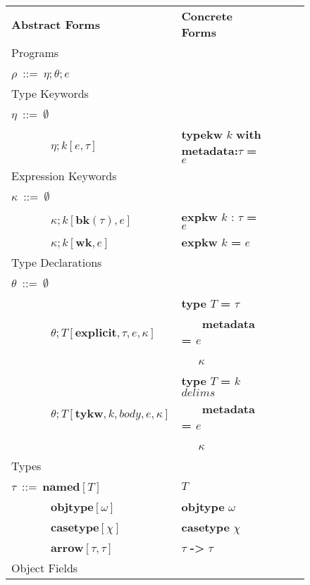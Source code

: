 \documentclass{sig-alternate}
\makeatletter
\newcommand\BeraMonottfamily{%
  \def\fvm@Scale{0.85}%
  \fontfamily{fvm}\selectfont%
}
\newcommand{\textcd}[1]{\textbf{\scriptsize\BeraMonottfamily{#1}}}
\newcommand{\tabularspace}{~~~~~~~}
\makeatother
\begin{document}
\begin{figure}[ht]
\begin{tabular}{ l l l l l }
 \multicolumn{1}{l}{\textbf{Abstract Forms}} & \multicolumn{1}{l}{\textbf{Concrete Forms}}\\
 \multicolumn{3}{l}{Programs}\\
$\rho$~::=~$\eta;\theta;e$\\
\multicolumn{3}{l}{Type Keywords}\\
$\eta$~::=~$\emptyset$\\
\tabularspace$\eta;k[e,\tau]$ & \textcd{typekw} $k$ \textcd{with metadata:}$\tau$ \textcd{=} $e$ \\
\multicolumn{3}{l}{Expression Keywords}\\
$\kappa$~::=~$\emptyset$                        & \\
\tabularspace$\kappa;k[\mathbf{bk}(\tau),e]$    & \textcd{expkw} $k$ : $\tau$ \textcd{=} $e$\\
\tabularspace$\kappa;k[\mathbf{wk},e]$          & \textcd{expkw} $k$ \textcd{=} $e$\\
\multicolumn{3}{l}{Type Declarations}\\
$\theta$~::=~$\emptyset$                        & \\
\multirow{ 3}{*}{\tabularspace$\theta; T[\mathbf{explicit},\tau, e, \kappa]$ }   & \textcd{type} $T$ \textcd{=} $\tau$\\
\tabularspace&~~~\textcd{metadata = }$e$\\
\tabularspace&~~~$\kappa$\\
\multirow{3}{*}{\tabularspace$\theta; T[\mathbf{tykw},k, body, e, \kappa]$}  & \textcd{type} $T$ \textcd{=} $k$ $delims$\\
                                                          & ~~~\textcd{metadata = }$e$\\
                                                          & ~~~$\kappa$\\
\multicolumn{3}{l}{Types}\\
$\tau$~::=~$\mathbf{named}[T]$              & $T$\\
\tabularspace$\mathbf{objtype}[\omega]$       & \textcd{objtype} $\omega$ \\
\tabularspace$\mathbf{casetype}[\chi]$        & \textcd{casetype} $\chi$\\
\tabularspace$\mathbf{arrow}[\tau, \tau]$     & $\tau$ \textcd{->} $\tau$\\
\multicolumn{3}{l}{Object Fields}\\       

\end{tabular}
\end{figure}
\end{document}
